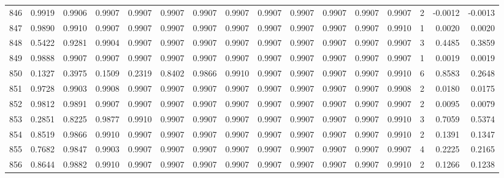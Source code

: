 \begin{tabular}{lrrrrrrrrrrrrrrr}
846 &      0.9919 &  0.9906 &  0.9907 &  0.9907 &  0.9907 &  0.9907 &  0.9907 &  0.9907 &  0.9907 &  0.9907 &   0.9907 &     0.9907 &      2 &                   -0.0012 &                    -0.0013 \\
847 &      0.9890 &  0.9910 &  0.9907 &  0.9907 &  0.9907 &  0.9907 &  0.9907 &  0.9907 &  0.9907 &  0.9907 &   0.9907 &     0.9910 &      1 &                    0.0020 &                     0.0020 \\
848 &      0.5422 &  0.9281 &  0.9904 &  0.9907 &  0.9907 &  0.9907 &  0.9907 &  0.9907 &  0.9907 &  0.9907 &   0.9907 &     0.9907 &      3 &                    0.4485 &                     0.3859 \\
849 &      0.9888 &  0.9907 &  0.9907 &  0.9907 &  0.9907 &  0.9907 &  0.9907 &  0.9907 &  0.9907 &  0.9907 &   0.9907 &     0.9907 &      1 &                    0.0019 &                     0.0019 \\
850 &      0.1327 &  0.3975 &  0.1509 &  0.2319 &  0.8402 &  0.9866 &  0.9910 &  0.9907 &  0.9907 &  0.9907 &   0.9907 &     0.9910 &      6 &                    0.8583 &                     0.2648 \\
851 &      0.9728 &  0.9903 &  0.9908 &  0.9907 &  0.9907 &  0.9907 &  0.9907 &  0.9907 &  0.9907 &  0.9907 &   0.9907 &     0.9908 &      2 &                    0.0180 &                     0.0175 \\
852 &      0.9812 &  0.9891 &  0.9907 &  0.9907 &  0.9907 &  0.9907 &  0.9907 &  0.9907 &  0.9907 &  0.9907 &   0.9907 &     0.9907 &      2 &                    0.0095 &                     0.0079 \\
853 &      0.2851 &  0.8225 &  0.9877 &  0.9910 &  0.9907 &  0.9907 &  0.9907 &  0.9907 &  0.9907 &  0.9907 &   0.9907 &     0.9910 &      3 &                    0.7059 &                     0.5374 \\
854 &      0.8519 &  0.9866 &  0.9910 &  0.9907 &  0.9907 &  0.9907 &  0.9907 &  0.9907 &  0.9907 &  0.9907 &   0.9907 &     0.9910 &      2 &                    0.1391 &                     0.1347 \\
855 &      0.7682 &  0.9847 &  0.9903 &  0.9907 &  0.9907 &  0.9907 &  0.9907 &  0.9907 &  0.9907 &  0.9907 &   0.9907 &     0.9907 &      4 &                    0.2225 &                     0.2165 \\
856 &      0.8644 &  0.9882 &  0.9910 &  0.9907 &  0.9907 &  0.9907 &  0.9907 &  0.9907 &  0.9907 &  0.9907 &   0.9907 &     0.9910 &      2 &                    0.1266 &                     0.1238 \\

\end{tabular}
